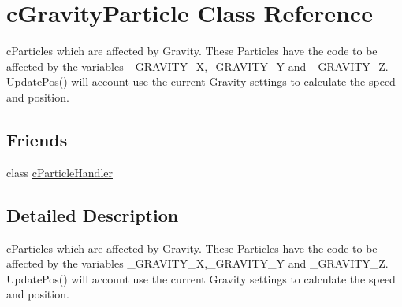 \hypertarget{classc_gravity_particle}{
\section{cGravityParticle Class Reference}
\label{classc_gravity_particle}
}


cParticles which are affected by Gravity. These Particles have the code to be affected by the variables \_\-GRAVITY\_\-X,\_\-GRAVITY\_\-Y and \_\-GRAVITY\_\-Z. UpdatePos() will account use the current Gravity settings to calculate the speed and position.  


\subsection*{Friends}
\begin{DoxyCompactItemize}
\item 
\hypertarget{classc_gravity_particle_ad810bc5f0330a0154ffaabe8d256379c}{
class \hyperlink{classc_gravity_particle_ad810bc5f0330a0154ffaabe8d256379c}{cParticleHandler}}
\label{classc_gravity_particle_ad810bc5f0330a0154ffaabe8d256379c}

\end{DoxyCompactItemize}


\subsection{Detailed Description}
cParticles which are affected by Gravity. These Particles have the code to be affected by the variables \_\-GRAVITY\_\-X,\_\-GRAVITY\_\-Y and \_\-GRAVITY\_\-Z. UpdatePos() will account use the current Gravity settings to calculate the speed and position. 